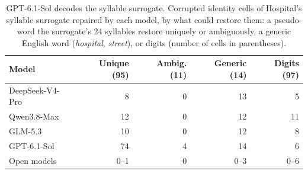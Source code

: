 \begin{table}[t]
  \caption{GPT-6.1-Sol decodes the syllable surrogate. Corrupted identity cells of Hospital's syllable surrogate repaired
  by each model, by what could restore them: a pseudo-word the surrogate's 24 syllables restore uniquely or
  ambiguously, a generic English word (\emph{hospital}, \emph{street}), or digits (number of cells in parentheses).}
  \label{tab:decoding}
  \small
  \setlength{\tabcolsep}{4pt}
  \begin{tabular}{@{}lrrrr@{}}
    \toprule
    Model & Unique (95) & Ambig. (11) & Generic (14) & Digits (97) \\
    \midrule
    DeepSeek-V4-Pro & 8 & 0 & 13 & 5 \\
    Qwen3.8-Max & 12 & 0 & 12 & 11 \\
    GLM-5.3 & 10 & 0 & 12 & 8 \\
    GPT-6.1-Sol & 74 & 4 & 14 & 6 \\
    Open models & 0--1 & 0 & 0--3 & 0--6 \\
    \bottomrule
  \end{tabular}
\end{table}

